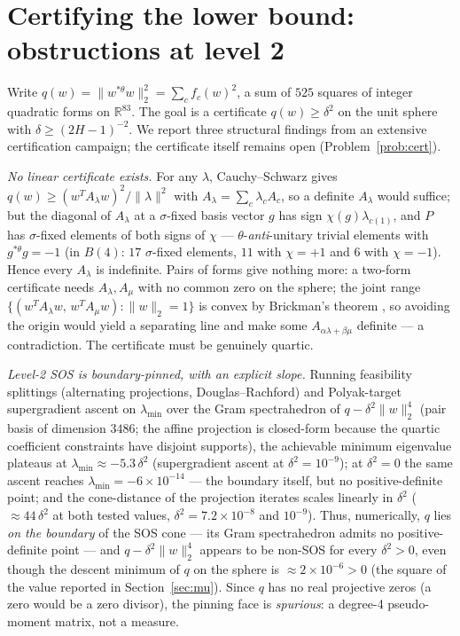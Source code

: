 \documentclass[11pt]{article}
\newcommand{\RR}{\mathbb{R}}
\newcommand{\thst}{{*\theta}}
\begin{document}
\section{Certifying the lower bound: obstructions at level 2}
\label{sec:sos}

Write $q(w)=\|w^{\thst}w\|_2^2=\sum_c f_c(w)^2$, a sum of $525$
squares of integer quadratic forms on $\RR^{83}$.  The goal is a
certificate $q(w)\ge\delta^2$ on the unit sphere with
$\delta\ge(2H-1)^{-2}$.  We report three structural findings from an
extensive certification campaign; the certificate itself remains open
(Problem~\ref{prob:cert}).

\emph{No linear certificate exists.}  For any $\lambda$,
Cauchy--Schwarz gives $q(w)\ge (w^TA_\lambda w)^2/\|\lambda\|^2$ with
$A_\lambda=\sum_c\lambda_cA_c$, so a definite $A_\lambda$ would
suffice; but the diagonal of $A_\lambda$ at a $\sigma$-fixed basis
vector $g$ has sign $\chi(g)\lambda_{c(1)}$, and $P$ has
$\sigma$-fixed elements of both signs of $\chi$ ---
$\theta$-\emph{anti}-unitary trivial elements with $g^{\thst}g=-1$
(in $B(4)$: $17$ $\sigma$-fixed elements, $11$ with $\chi=+1$ and $6$
with $\chi=-1$).  Hence every $A_\lambda$ is indefinite.  Pairs of
forms give nothing more: a two-form certificate needs
$A_\lambda,A_\mu$ with no common zero on the sphere; the joint range
$\{(w^TA_\lambda w,\,w^TA_\mu w):\|w\|_2=1\}$ is convex by Brickman's
theorem \cite{Brickman1961}, so avoiding the origin would yield a
separating line and make some $A_{\alpha\lambda+\beta\mu}$ definite
--- a contradiction.  The certificate must be genuinely quartic.

\emph{Level-2 SOS is boundary-pinned, with an explicit slope.}
Running feasibility splittings (alternating projections,
Douglas--Rachford) and Polyak-target supergradient ascent on
$\lambda_{\min}$ over the Gram spectrahedron of
$q-\delta^2\|w\|_2^4$ (pair basis of dimension $3486$; the affine
projection is closed-form because the quartic coefficient constraints
have disjoint supports), the achievable minimum eigenvalue plateaus at
$\lambda_{\min}\approx -5.3\,\delta^2$ (supergradient ascent at
$\delta^2=10^{-9}$); at $\delta^2=0$ the same ascent reaches
$\lambda_{\min}=-6\times10^{-14}$ --- the boundary itself, but no
positive-definite point; and the cone-distance of the projection
iterates scales linearly in $\delta^2$ ($\approx 44\,\delta^2$ at both
tested values, $\delta^2=7.2\times10^{-8}$ and $10^{-9}$).  Thus,
numerically, $q$ lies \emph{on the boundary} of the SOS cone --- its
Gram spectrahedron admits no positive-definite point --- and
$q-\delta^2\|w\|_2^4$ appears to be non-SOS for every $\delta^2>0$,
even though the descent minimum of $q$ on the sphere is
$\approx2\times10^{-6}>0$ (the square of the value reported in
Section~\ref{sec:mu}).  Since $q$ has no real projective zeros (a zero
would be a zero divisor), the pinning face is \emph{spurious}: a
degree-4 pseudo-moment matrix, not a measure.
\end{document}
